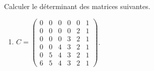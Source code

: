

\begin{exercice}\label{exoINGE1121La0006}

	Calculer le déterminant des matrices suivantes.
	\begin{enumerate}

		\item
			$C=\begin{pmatrix}
				0	&	0	&	0	&	0	&	0	&	1\\	
				0	&	0	&	0	&	0	&	2	&	1\\
				0	&	0	&	0	&	3	&	2	&	1\\
				0	&	0	&	4	&	3	&	2	&	1\\
				0	&	5	&	4	&	3	&	2	&	1\\
				6	&	5	&	4	&	3	&	2	&	1
			\end{pmatrix}$.

	\end{enumerate}

\end{exercice}
